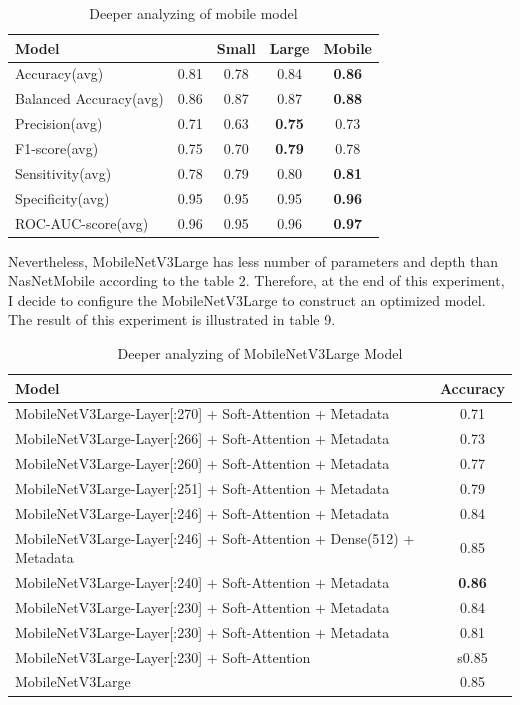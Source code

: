 \begin{table}[ht]
	\centering	
	\begin{tabular}{|l | c | c | c | c|} 
		\hline
		Model & \cite{04381} & \cite{02244}Small & \cite{02244}Large & \cite{07012}Mobile\\
		\hline
		Accuracy(avg) & 0.81 & 0.78 & 0.84 & \textbf{0.86}\\
		\hline
		Balanced Accuracy(avg) & 0.86 & 0.87 & 0.87 & \textbf{0.88}\\ 
		\hline
		Precision(avg) & 0.71 & 0.63 & \textbf{0.75} & 0.73\\
		\hline
		F1-score(avg) & 0.75 & 0.70 & \textbf{0.79} & 0.78\\
		\hline
		Sensitivity(avg) & 0.78 & 0.79 & 0.80 & \textbf{0.81}\\ 
		\hline
		Specificity(avg) & 0.95 & 0.95 & 0.95 & \textbf{0.96}\\
		\hline
		ROC-AUC-score(avg) & 0.96 & 0.95 & 0.96 & \textbf{0.97}\\
		\hline
	\end{tabular}
	\caption{Deeper analyzing of mobile model}
	\label{table:8}
\end{table}
\FloatBarrier
Nevertheless, MobileNetV3Large has less number of parameters and depth than NasNetMobile according to the table 2. Therefore, at the end of this experiment, I decide to configure the MobileNetV3Large to construct an optimized model. The result of this experiment is illustrated in table 9.
\FloatBarrier
\begin{table}[ht]
	\centering
	\begin{tabular}{|l | c |}
		\hline
		Model & Accuracy\\
		\hline
		MobileNetV3Large-Layer[:270] + Soft-Attention + Metadata & 0.71 \\
		\hline
		MobileNetV3Large-Layer[:266] + Soft-Attention + Metadata  & 0.73 \\
		\hline
		MobileNetV3Large-Layer[:260] + Soft-Attention + Metadata  & 0.77 \\
		\hline
		MobileNetV3Large-Layer[:251] + Soft-Attention + Metadata  & 0.79 \\
		\hline
		MobileNetV3Large-Layer[:246] + Soft-Attention + Metadata  & 0.84 \\
		\hline
		MobileNetV3Large-Layer[:246] + Soft-Attention + Dense(512) + Metadata & 0.85 \\
		\hline
		MobileNetV3Large-Layer[:240] + Soft-Attention + Metadata  & \textbf{0.86}\\
		\hline
		MobileNetV3Large-Layer[:230] + Soft-Attention + Metadata  & 0.84 \\
		\hline
		MobileNetV3Large-Layer[:230] + Soft-Attention + Metadata  & 0.81 \\
		\hline
		MobileNetV3Large-Layer[:230] + Soft-Attention & s0.85 \\ 
		\hline
		MobileNetV3Large & 0.85 \\ 
		\hline
	\end{tabular}
	\caption{Deeper analyzing of MobileNetV3Large Model}
	\label{table:9}
\end{table}
